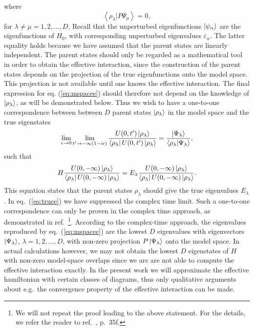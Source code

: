 \begin{itemize}
\begin{equation}
\label{eq:parent}
\end{equation}
where 
\begin{equation}
{\left\langle\rho_{\lambda} | P\Psi_{\mu} \right\rangle}=0,
\end{equation}
for $\lambda\neq\mu =1,2,\dots ,D$. Recall that the unperturbed
eigenfunctions $\left| \psi_{\alpha} \right\rangle$ are the eigenfunctions of $H_0$, with
corresponding unperturbed eigenvalues $\varepsilon_{\alpha}$.
The latter equality holds because we
have assumed that the parent states are linearly independent.
The parent states should only be regarded as a mathematical tool in order
to obtain the effective interaction, since the construction of the parent
states depends on the projection of the true eigenfunctions onto the model
space. This projection is not available until one knows the effective
interaction. The final expression for eq. (\ref{eq:mspacee}) should
therefore not depend on the knowledge of $\left| \rho_{\lambda} \right\rangle$, as will
be demonstrated below.
Thus we wish to have a one-to-one correspondence between between $D$ parent
states $\left| \rho_{\lambda} \right\rangle$ in the model space and the true eigenstates
\begin{equation}
   \lim_{\epsilon \rightarrow 0}
   \lim_{t'\rightarrow -\infty (1-i\epsilon )}
   \frac{U(0,t' )\left| \rho_{\lambda} \right\rangle }
   { \left\langle \rho_{\lambda} \right| U(0,t' )\left| \rho_{\lambda} \right\rangle }=
   \frac{\left| \Psi_{\lambda} \right\rangle}
   {\left\langle\rho_{\lambda} | \Psi_{\lambda} \right\rangle},
\end{equation}
such that 
\begin{equation}
    H\frac{U(0,-\infty )\left| \rho_{\lambda} \right\rangle }
    { \left\langle \rho_{\lambda} \right| U(0,-\infty )\left| \rho_{\lambda} \right\rangle }=
    E_{\lambda}\frac{U(0,-\infty )\left| \rho_{\lambda} \right\rangle }
    { \left\langle \rho_{\lambda} \right| U(0,-\infty )\left| \rho_{\lambda} \right\rangle }.
    \label{eq:truee}
\end{equation}
This equation states that the parent states $\rho_{\lambda}$
should give the true eigenvalues $E_{\lambda}$. In eq.\ (\ref{eq:truee})
we have suppressed the complex time limit. Such a one-to-one correspondence
can only be proven in the complex time approach, as demonstrated in ref.\
\cite{ko90}\footnote{We will not repeat the proof leading to the above statement.
For the details, we refer the reader to ref.\ \cite{ko90}, p.\ 35f.}. 
According to the complex-time approach, the eigenvalues
reproduced by eq.\ (\ref{eq:mspacee})
are the lowest $D$ eigenvalues with eigenvectors $\left| \Psi_{\lambda} \right\rangle$,
$\lambda =1,2,\dots ,D$, with non-zero projection $P\left| \Psi_{\lambda} \right\rangle$ onto
the model space. In actual calculations however, we may not obtain the 
lowest $D$ eigenstates of $H$ with non-zero model-space overlaps since we are
are not able to compute the effective interaction exactly. In the present
work we will approximate the effective hamiltonian with certain classes of 
diagrams, thus only qualitative arguments about e.g.\ the convergence
property of the effective interaction can be made. 
\end{itemize}

